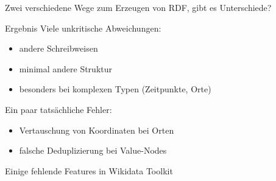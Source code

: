 \documentclass[aspectratio=1610,xcolor=svgnames]{beamer}
\begin{document}
\begin{frame}
\begin{center}
  \end{center}

  Zwei verschiedene Wege zum Erzeugen von RDF, gibt es Unterschiede?
\end{frame}

\begin{frame}{Ergebnis}
  Viele unkritische Abweichungen:
  \begin{itemize}
    \item andere Schreibweisen
    \item minimal andere Struktur
    \item besonders bei komplexen Typen (Zeitpunkte, Orte)
  \end{itemize}

  Ein paar tatsächliche Fehler:
  \begin{itemize}
      \item Vertauschung von Koordinaten bei Orten
      \item falsche Deduplizierung bei Value-Nodes
  \end{itemize}

  Einige fehlende Features in Wikidata Toolkit
\end{frame}
\end{document}
